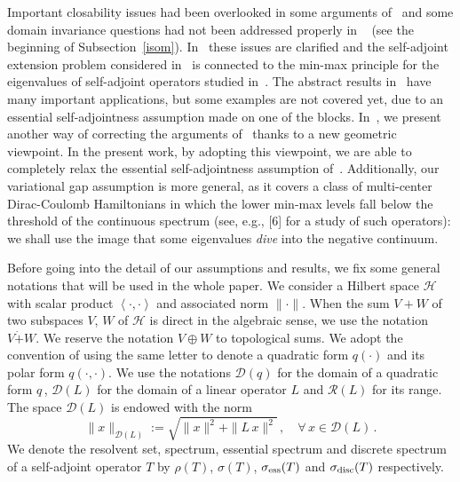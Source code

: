 \documentclass[12pt,reqno]{amsart}
\newcommand{\innerproduct}[2]{\left\langle #1, #2 \right\rangle}
\renewcommand{\(}{\left(}
\renewcommand{\)}{\right)}
\begin{document}
Important closability  issues had been overlooked in some arguments of~\cite{DES00a} and  some domain invariance questions had not been addressed properly in ~\cite{EstLos-07,EstLos-08} (see the beginning of Subsection~\ref{isom}).  In~\cite{SST20} these issues are clarified and the self-adjoint extension problem considered in~\cite{EstLos-07,EstLos-08} is connected to the min-max principle for the eigenvalues of self-adjoint operators studied in~\cite{DES00a}. The abstract results in~\cite{SST20} have many important applications, but some examples are not covered yet, due to an essential self-adjointness assumption made on one of the blocks. In~\cite[Corrigendum]{DES00a}, we present another way of correcting the arguments of~\cite{DES00a} thanks to a new geometric viewpoint. In the present work, by adopting this viewpoint, we are able to completely relax the essential self-adjointness assumption of~\cite{SST20}. Additionally, our variational gap assumption is more general, as it covers a class of multi-center Dirac-Coulomb Hamiltonians in which the lower min-max levels fall below the threshold of the continuous spectrum (see, e.g., [6] for a study of such operators): we shall use the image that some eigenvalues {\it dive} into the negative continuum. 

Before going into the detail of our assumptions and results, we fix some general notations that will be used in the whole paper. We consider a Hilbert space $\mathcal H$ with scalar product $\innerproduct{\cdot}{\cdot}$ and associated norm $\|\cdot\|$. When the sum $V+W$ of two subspaces $V$, $W$ of $\mathcal H$ is direct in the algebraic sense, we use the notation $V \dot{+} W$. We reserve the notation $V\oplus W$ to topological sums. We adopt the convention of using the same letter to denote a quadratic form $q(\cdot)$ and its polar form $q(\cdot,\cdot)$. We use the notations $\mathcal D(q)$ for the domain of a quadratic form $q\,$, $\mathcal D(L)$ for the domain of a linear operator $L$ and $\mathcal R(L)$ for its range.  The space $\mathcal D(L)$ is endowed with the norm
\[
\|x\|_{\mathcal D(L)}:=\sqrt{\|x\|^2+\|L\,x\|^2}\,,\quad\forall\,x\in\mathcal D(L)\,.
\]
We denote the resolvent set, spectrum, essential spectrum and discrete spectrum of a self-adjoint operator $T$ by $\rho(T)$, $\sigma(T)$, $\sigma_{\rm ess}(T)$ and $\sigma_{\rm disc}(T)$ respectively.
\end{document}
